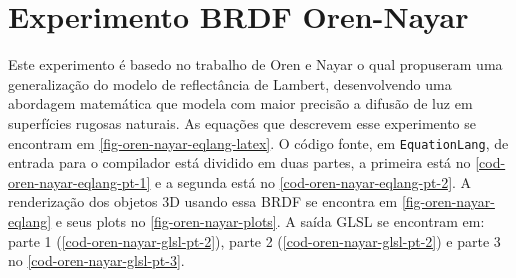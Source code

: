 \section{Experimento BRDF Oren-Nayar}

Este experimento é basedo no trabalho de Oren e Nayar \cite{oren1994generalization} o qual propuseram uma generalização do modelo de reflectância de Lambert, desenvolvendo uma abordagem matemática que modela com maior precisão a difusão de luz em superfícies rugosas naturais. As equações que descrevem esse experimento se encontram em \autoref{fig-oren-nayar-eqlang-latex}. O código fonte, em \texttt{EquationLang}, de entrada para o compilador está dividido em duas partes, a primeira está no \autoref{cod-oren-nayar-eqlang-pt-1} e a segunda está no \autoref{cod-oren-nayar-eqlang-pt-2}. A renderização dos objetos 3D usando essa BRDF se encontra em \autoref{fig-oren-nayar-eqlang} e seus plots no \autoref{fig-oren-nayar-plots}. A saída GLSL se encontram em: parte 1 (\autoref{cod-oren-nayar-glsl-pt-2}), parte 2 (\autoref{cod-oren-nayar-glsl-pt-2}) e parte 3 no \autoref{cod-oren-nayar-glsl-pt-3}.


